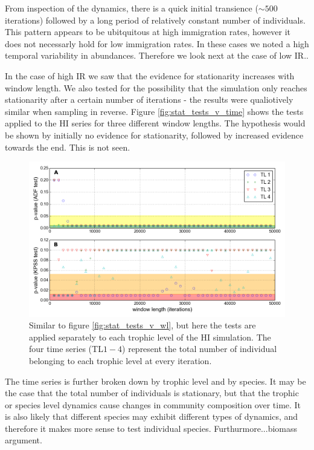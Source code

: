 From inspection of the dynamics, there is a quick initial transience ($\sim 500$ iterations) followed by a long period of relatively constant number of individuals. This pattern appears to be ubitquitous at high immigration rates, however it does not necessarly hold for low immigration rates. In these cases we noted a high temporal variability in abundances. Therefore we look next at the case of low IR..

In the case of high IR we saw that the evidence for stationarity increases with window length. We also tested for the possibility that the simulation only reaches stationarity after a certain number of iterations - the results were qualiotively similar when sampling in reverse. Figure \ref{fig:stat_tests_v_time} shows the tests applied to the HI series for three different window lengths. The hypothesis would be shown by initially no evidence for stationarity, followed by increased evidence towards the end. This is not seen. 

\begin{figure}[hb]
	\centering
	\includegraphics[width=0.8\linewidth]{"./chapters/chapter04b/figures/Rtests/tl_stat_tests_v_wl"}
     \caption{Similar to figure \ref{fig:stat_tests_v_wl}, but here the tests are applied separately to each trophic level of the HI simulation. The four time series (TL$1-4$) represent the total number of individual belonging to each trophic level at every iteration.} 
     \label{fig:tl_stat_tests_v_wl}   
\end{figure}

The time series is further broken down by trophic level and by species. It may be the case that the total number of individuals is stationary, but that the trophic or species level dynamics cause changes in community composition over time. It is also  likely that different species may exhibit different types of dynamics, and therefore it makes more sense to test individual species. Furthurmore...biomass argument.  

